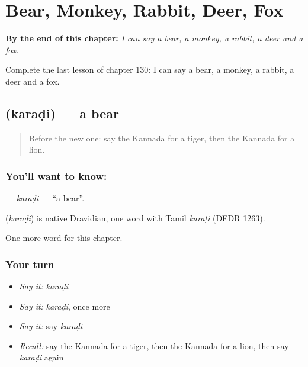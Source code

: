 
\chapter{Bear, Monkey, Rabbit, Deer, Fox}
\label{ch:ka-bear-monkey-rabbit-deer-fox}

\begin{chapteropening}
\textbf{By the end of this chapter:} \emph{I can say a bear, a monkey, a rabbit, a deer and a fox.}

Complete the last lesson of chapter 130: I can say a bear, a monkey, a rabbit, a deer and a fox.
\end{chapteropening}

\section[\texorpdfstring{\kn{ಕರಡಿ} (karaḍi)}{ಕರಡಿ (karaḍi)}]{ (karaḍi) — a bear}

\label{lesson:KA-C130-karadi}



\begin{quote}
Before the new one: say the Kannada for a tiger, then the Kannada for a lion.
\end{quote}

\subsection*{You'll want to know: }
\textbf{} — \emph{karaḍi} — \textquotedblleft{}a bear\textquotedblright{}.

\begin{cousinweb}
\textbf{} (\emph{karaḍi}) is native Dravidian, one word with Tamil \emph{karaṭi} (DEDR 1263).
\end{cousinweb}

\begin{grammarlens}[title={What you've built}]
One more word for this chapter.
\end{grammarlens}

\subsection*{Your turn}
\begin{itemize}
\raggedright
  \item \emph{Say it:} \emph{karaḍi}
  \item \emph{Say it:} \emph{karaḍi}, once more
  \item \emph{Say it:} say \emph{karaḍi}
  \item \emph{Recall:} say the Kannada for a tiger, then the Kannada for a lion, then say \emph{karaḍi} again
\end{itemize}

